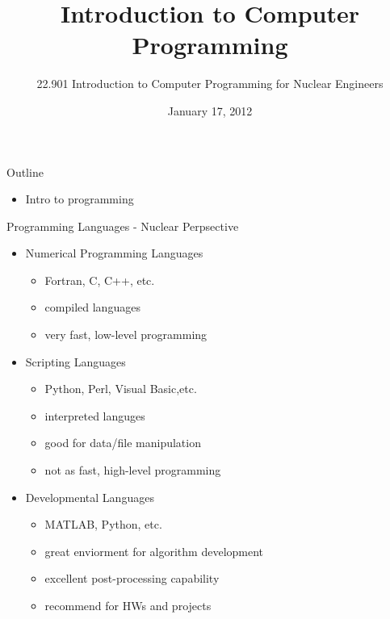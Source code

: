 \documentclass{beamer}
\title[Introduction to Computer Programming]{Introduction to Computer Programming}
\author[]{22.901 Introduction to Computer Programming for Nuclear Engineers}
\institute[\insertpagenumber]{}
\date{January 17, 2012}
\begin{document}

\frame{\titlepage}

\begin{frame}{Outline}
  \begin{itemize}
   \item Intro to programming
  \end{itemize}
\end{frame}
\begin{frame}{Programming Languages - Nuclear Perpsective}
\begin{itemize}

  \item Numerical Programming Languages
  \begin{itemize}
      \item Fortran, C, C++, etc.
      \item compiled languages
      \item very fast, low-level programming
  \end{itemize}

  \item Scripting Languages
    \begin{itemize}
      \item Python, Perl, Visual Basic,etc.
      \item interpreted languges
      \item good for data/file manipulation
      \item not as fast, high-level programming
    \end{itemize}

  \item Developmental Languages
    \begin{itemize}
      \item MATLAB, Python, etc.
      \item great enviorment for algorithm development
      \item excellent post-processing capability
      \item recommend for HWs and projects
    \end{itemize}

\end{itemize}
\end{frame}
\end{document}
